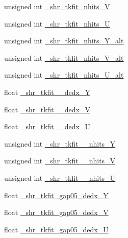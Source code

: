 \begin{DoxyCompactItemize}
unsigned int \hyperlink{classselection_1_1CC0piNpSelection_adab23c54dd799cdf83c31a10e4ae9061}{\+\_\+shr\+\_\+tkfit\+\_\+nhits\+\_\+V}
\item 
unsigned int \hyperlink{classselection_1_1CC0piNpSelection_a6c75f5783174133ce97849f128f3dee3}{\+\_\+shr\+\_\+tkfit\+\_\+nhits\+\_\+U}
\item 
unsigned int \hyperlink{classselection_1_1CC0piNpSelection_ae147f3006253b7689636993c76221f21}{\+\_\+shr\+\_\+tkfit\+\_\+nhits\+\_\+\+Y\+\_\+alt}
\item 
unsigned int \hyperlink{classselection_1_1CC0piNpSelection_abd57bba0cf3b1c9268afc03e8713df13}{\+\_\+shr\+\_\+tkfit\+\_\+nhits\+\_\+\+V\+\_\+alt}
\item 
unsigned int \hyperlink{classselection_1_1CC0piNpSelection_a2a432bd36ae5dc824470183ca6621218}{\+\_\+shr\+\_\+tkfit\+\_\+nhits\+\_\+\+U\+\_\+alt}
\item 
float \hyperlink{classselection_1_1CC0piNpSelection_a3fce1b66b45df22120481d91b16957ba}{\+\_\+shr\+\_\+tkfit\+\_\+2cm\+\_\+dedx\+\_\+Y}
\item 
float \hyperlink{classselection_1_1CC0piNpSelection_a02be9f071fa5ee210e34b5914d428591}{\+\_\+shr\+\_\+tkfit\+\_\+2cm\+\_\+dedx\+\_\+V}
\item 
float \hyperlink{classselection_1_1CC0piNpSelection_a2ae6bb1925bd4f20deb1427c2bde2674}{\+\_\+shr\+\_\+tkfit\+\_\+2cm\+\_\+dedx\+\_\+U}
\item 
unsigned int \hyperlink{classselection_1_1CC0piNpSelection_a267f9073fa07d7c1c5e40b79a935c585}{\+\_\+shr\+\_\+tkfit\+\_\+2cm\+\_\+nhits\+\_\+Y}
\item 
unsigned int \hyperlink{classselection_1_1CC0piNpSelection_a4d79a5a52fba98286c68079f9a3e04cb}{\+\_\+shr\+\_\+tkfit\+\_\+2cm\+\_\+nhits\+\_\+V}
\item 
unsigned int \hyperlink{classselection_1_1CC0piNpSelection_ab659c0c62a77c77e745829478828e100}{\+\_\+shr\+\_\+tkfit\+\_\+2cm\+\_\+nhits\+\_\+U}
\item 
float \hyperlink{classselection_1_1CC0piNpSelection_a82a0f0efca7cceee176b7058001073a6}{\+\_\+shr\+\_\+tkfit\+\_\+gap05\+\_\+dedx\+\_\+Y}
\item 
float \hyperlink{classselection_1_1CC0piNpSelection_a711b325a6f6cb77db530eb21e1c99fc0}{\+\_\+shr\+\_\+tkfit\+\_\+gap05\+\_\+dedx\+\_\+V}
\item 
float \hyperlink{classselection_1_1CC0piNpSelection_ad0504ef7cf7c8fa5a0059fbaedd6861b}{\+\_\+shr\+\_\+tkfit\+\_\+gap05\+\_\+dedx\+\_\+U}
\item 

\end{DoxyCompactItemize}
